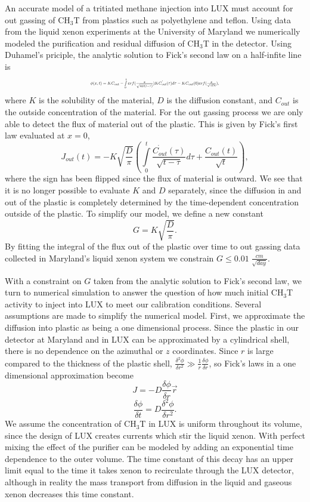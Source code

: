\newcommand*{\Scale}[2][4]{\scalebox{#1}{$#2$}}%

An accurate model of a tritiated methane injection into LUX must account for out gassing of CH$_3$T from plastics such as polyethylene and teflon.  Using data from the liquid xenon experiments at the University of Maryland we numerically modeled the purification and residual diffusion of CH$_3$T in the detector.  Using Duhamel's priciple, the analytic solution to Fick's second law on a half-infite line is
\[\Scale[0.5]{\phi (x,t) = KC_{out} - \int \limits_0^t erf(\frac{x}{\sqrt{4D(t - \tau)}})K\dot{C_{out}}(\tau)d\tau - KC_{out}(0)erf(\frac{x}{\sqrt{4Dt}}),}\]
where $K$ is the solubility of the material, $D$ is the diffusion constant, and $C_{out}$ is the outside concentration of the material. \cite{Piche} For the out gassing process we are only able to detect the flux of material out of the plastic.  This is given by Fick's first law evaluated at $x=0$,
\[J_{out}(t)= - K \sqrt{\frac{D}{\pi}}( \int \limits_0^t \frac{\dot{C_{out}}(\tau)}{\sqrt{t-\tau}} d \tau + \frac{C_{out}(t)}{\sqrt{t}}),\]
where the sign has been flipped since the flux of material is outward.  We see that it is no longer possible to evaluate $K$ and $D$ separately, since the diffusion in and out of the plastic is completely determined by the time-dependent concentration outside of the plastic.  To simplify our model, we define a new constant
\[ G = K \sqrt{ \frac{D}{ \pi }} .\]
By fitting the integral of the flux out of the plastic over time to out gassing data collected in Maryland's liquid xenon system we constrain $G \leq 0.01 \; \frac{cm}{\sqrt{day}}.$ 

With a constraint on $G$ taken from the analytic solution to Fick's second law, we turn to numerical simulation to answer the question of how much initial CH$_3$T activity to inject into LUX to meet our calibration conditions.  Several assumptions are made to simplify the numerical model.  First, we approximate the diffusion into plastic as being a one dimensional process.  Since the plastic in our detector at Maryland and in LUX can be approximated by a cylindrical shell, there is no dependence on the azimuthal or $z$ coordinates.  Since $r$ is large compared to the thickness of the plastic shell, $\frac{\delta^2 \phi}{\delta r^2} \gg \frac{1}{r} \frac {\delta \phi}{\delta r}$, so Fick's laws in a one dimensional approximation become
\[J=-D\frac{\delta \phi}{\delta r}\vec{r}\]
\[\frac{\delta \phi}{\delta t} = D \frac{\delta^2 \phi}{\delta r^2}.\]  We assume the concentration of CH$_3$T in LUX is uniform throughout its volume, since the design of LUX creates currents which stir the liquid xenon.  With perfect mixing the effect of the purifier can be modeled by adding an exponential time dependence to the outer volume.  The time constant of this decay has an upper limit equal to the time it takes xenon to recirculate through the LUX detector, although in reality the mass transport from diffusion in the liquid and gaseous xenon decreases this time constant. 

